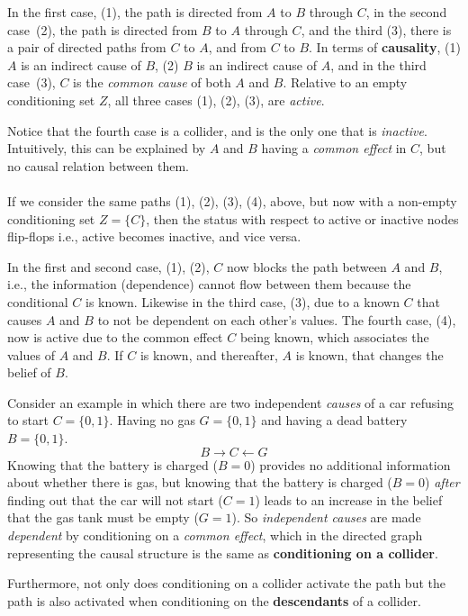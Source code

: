 \documentclass{article}
\begin{document}
\noindent In the first case, (1), the path is directed from $A$ to $B$ through $C$, in the second case~(2), the path is directed from $B$ to $A$ through $C$, and the third (3), there is a pair of directed paths from $C$ to $A$, and from $C$ to $B$. In terms of \textbf{causality}, (1) $A$ is an indirect cause of $B$, (2) $B$ is an indirect cause of $A$, and in the third case~(3), $C$ is the \textit{common cause} of both $A$ and $B$. Relative to an empty conditioning set $Z$, all three cases (1), (2), (3), are \textit{active}. 

Notice that the fourth case is a collider, and is the only one that is \textit{inactive}. Intuitively, this can be explained by $A$ and $B$ having a \textit{common effect} in $C$, but no causal relation between them. 
\\
\\
\noindent If we consider the same paths (1), (2), (3), (4), above, but now with a non-empty conditioning set $Z = \{C\}$, then the status with respect to active or inactive nodes flip-flops i.e., active becomes inactive, and vice versa. 

In the first and second case, (1), (2), $C$ now blocks the path between $A$ and $B$, i.e., the information (dependence) cannot flow between them because the conditional $C$ is known. Likewise in the third case, (3), due to a known $C$ that causes $A$ and $B$ to not be dependent on each other's values. The fourth case, (4), now is active due to the common effect $C$ being known, which associates the values of $A$ and $B$. If $C$ is known, and thereafter, $A$ is known, that changes the belief of $B$. 

Consider an example in which there are two independent \textit{causes} of a car refusing to start $C = \{0, 1\}$. Having no gas $G = \{0, 1\}$ and having a dead battery $B = \{0, 1\}$.
$$
    B \rightarrow C \leftarrow G
$$
Knowing that the battery is charged ($B = 0$) provides no additional information about whether there is gas, but knowing that the battery is charged ($B = 0$) \textit{after} finding out that the car will not start ($C = 1$) leads to an increase in the belief that the gas tank must be empty ($G = 1$). So \textit{independent causes} are made \textit{dependent} by conditioning on a \textit{common effect}, which in the directed graph representing the causal structure is the same as \textbf{conditioning on a collider}. 

Furthermore, not only does conditioning on a collider activate the path but the path is also activated when conditioning on the \textbf{descendants} of a collider.  
\end{document}
